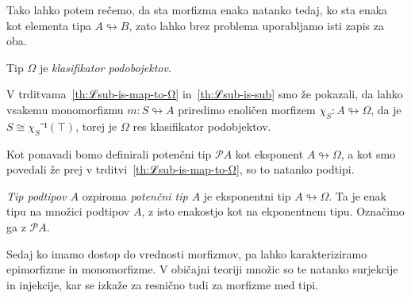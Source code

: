 Tako lahko potem rečemo, da sta morfizma enaka natanko tedaj, ko sta enaka kot
elementa tipa \(A ↬ B\), zato lahko brez problema uporabljamo isti zapis za oba.

\begin{trditev}\label{th:Ω-is-subobj-class}
  Tip \(Ω\) je \emph{klasifikator podobojektov}.
\end{trditev}
\begin{dokaz}
  V trditvama~\ref{th:ℒsub-is-map-to-Ω} in~\ref{th:ℒsub-is-sub} smo že pokazali,
  da lahko vsakemu monomorfizmu \({m : S ↬ A}\) priredimo enoličen morfizem
  \(χ_S : A ↬ Ω\), da je \(S ≅ χ_S⁻¹(⊤)\), torej je \(Ω\) res klasifikator
  podobjektov.
\end{dokaz}

Kot ponavadi bomo definirali potenčni tip \(𝒫A\) kot eksponent \(A ↬ Ω\), a kot
smo povedali že prej v trditvi~\ref{th:ℒsub-is-map-to-Ω}, so to natanko podtipi.

\begin{konstrukcija}\label{cons:subobjs}
  \emph{Tip podtipov \(A\)} ozpiroma \emph{potenčni tip \(A\)} je eksponentni
  tip \(A ↬ Ω\). Ta je enak tipu na množici podtipov \(A\), z isto enakostjo kot
  na ekponentnem tipu. Označimo ga z \(𝒫{A}\).
\end{konstrukcija}

Sedaj ko imamo dostop do vrednosti morfizmov, pa lahko karakteriziramo
epimorfizme in monomorfizme. V običajni teoriji množic so te natanko surjekcije
in injekcije, kar se izkaže za resnično tudi za morfizme med tipi.

